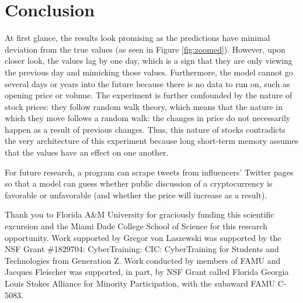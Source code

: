 \section{Conclusion}

At first glance, the results look promising as the predictions have
minimal deviation from the true values (as seen in Figure
\ref{fig:zoomed}). However, upon closer look, the values lag by one
day, which is a sign that they are only viewing the previous day and
mimicking those values. Furthermore, the model cannot go several days
or years into the future because there is no data to run on, such as
opening price or volume. The experiment is further confounded by the
nature of stock prices: they follow random walk theory, which means
that the nature in which they move follows a random walk: the changes
in price do not necessarily happen as a result of previous
changes. Thus, this nature of stocks contradicts the very architecture
of this experiment because long short-term memory assumes that the
values have an effect on one another.

For future research, a program can scrape tweets from influencers'
Twitter pages so that a model can guess whether public discussion of a
cryptocurrency is favorable or unfavorable (and whether the price will
increase as a result).


\begin{acks}
  
Thank you to Florida A\&M University for graciously funding this
scientific excursion and the Miami Dade College School of Science for
this research opportunity. Work supported by Gregor von Laszewski was
supported by the NSF Grant \#1829704: CyberTraining: CIC:
CyberTraining for Students and Technologies from Generation Z.  Work
conducted by members of FAMU and Jacques Fleischer was supported, in
part, by NSF Grant called Florida Georgia Louis Stokes Alliance for
Minority Participation, with the subaward FAMU C-5083.

\end{acks}


